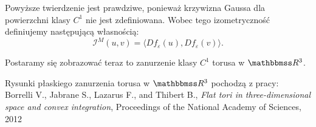 \begin{frame}

\begin{uwaga}
Powyższe twierdzenie jest prawdziwe, ponieważ krzywizna Gaussa dla powierzchni klasy $C^1$ nie jest zdefiniowana. Wobec tego izometryczność definiujemy następującą własnością:
\[\mathcal{I}^M(u,v)=\langle Df_\varepsilon(u), Df_\varepsilon(v) \rangle.\]
\end{uwaga}
\pause Postaramy się zobrazować teraz to zanurzenie klasy $C^1$ torusa w $\R^3$. %


\vfill \footnotesize{Rysunki płaskiego zanurzenia torusa w $\R^3$ pochodzą z pracy:\\
Borrelli V., Jabrane S., Lazarus F., and Thibert B.,
\textit{Flat tori in three-dimensional space and convex integration}, Proceedings of the National Academy of Sciences, 2012}



\end{frame}
\newpage
